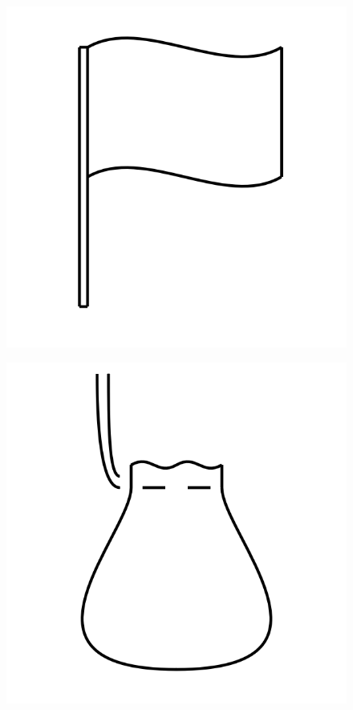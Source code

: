 \documentclass[17pt]{extreport}
\begin{document}
	\begin{figure}
		\centering
		\includegraphics[width=7.25in]{imageserver/uploadimages/flag.png}
	\end{figure}
	\begin{figure}
		\centering
		\includegraphics[width=7.25in]{imageserver/uploadimages/bag.png}
	\end{figure}
	
\end{document}
